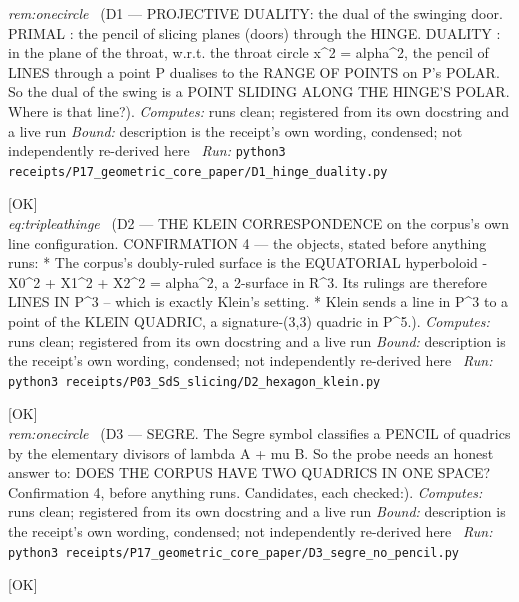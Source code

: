 \begin{description}
\textit{rem:onecircle} \ (D1 --- PROJECTIVE DUALITY: the dual of the swinging door. PRIMAL : the pencil of slicing planes (doors) through the HINGE. DUALITY : in the plane of the throat, w.r.t. the throat circle \textbar{}x\textbar{}\textasciicircum{}2 = alpha\textasciicircum{}2, the pencil of LINES through a point P dualises to the RANGE OF POINTS on P's POLAR. So the dual of the swing is a POINT SLIDING ALONG THE HINGE'S POLAR. Where is that line?). 
\emph{Computes:} runs clean; registered from its own docstring and a live run
 \emph{Bound:} description is the receipt's own wording, condensed; not independently re-derived here
\ \emph{Run:} \texttt{python3 receipts/P17\_geometric\_core\_paper/D1\_hinge\_duality.py}
\item[\label{rcpt:D2_hexagon_klein}\texttt{D2\_hexagon\_klein}]\hfill\textsf{[OK]}\\
\textit{eq:tripleathinge} \ (D2 --- THE KLEIN CORRESPONDENCE on the corpus's own line configuration. CONFIRMATION 4 --- the objects, stated before anything runs: * The corpus's doubly-ruled surface is the EQUATORIAL hyperboloid -X0\textasciicircum{}2 + X1\textasciicircum{}2 + X2\textasciicircum{}2 = alpha\textasciicircum{}2, a 2-surface in R\textasciicircum{}3. Its rulings are therefore LINES IN P\textasciicircum{}3 -- which is exactly Klein's setting. * Klein sends a line in P\textasciicircum{}3 to a point of the KLEIN QUADRIC, a signature-(3,3) quadric in P\textasciicircum{}5.). 
\emph{Computes:} runs clean; registered from its own docstring and a live run
 \emph{Bound:} description is the receipt's own wording, condensed; not independently re-derived here
\ \emph{Run:} \texttt{python3 receipts/P03\_SdS\_slicing/D2\_hexagon\_klein.py}
\item[\label{rcpt:D3_segre_no_pencil}\texttt{D3\_segre\_no\_pencil}]\hfill\textsf{[OK]}\\
\textit{rem:onecircle} \ (D3 --- SEGRE. The Segre symbol classifies a PENCIL of quadrics by the elementary divisors of lambda A + mu B. So the probe needs an honest answer to: DOES THE CORPUS HAVE TWO QUADRICS IN ONE SPACE? Confirmation 4, before anything runs. Candidates, each checked:). 
\emph{Computes:} runs clean; registered from its own docstring and a live run
 \emph{Bound:} description is the receipt's own wording, condensed; not independently re-derived here
\ \emph{Run:} \texttt{python3 receipts/P17\_geometric\_core\_paper/D3\_segre\_no\_pencil.py}
\item[\label{rcpt:D4_fold_scaling}\texttt{D4\_fold\_scaling}]\hfill\textsf{[OK]}\\

\end{description}
